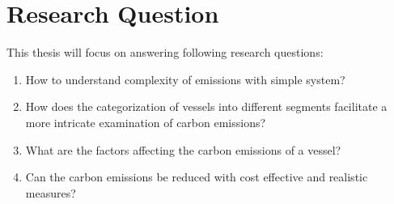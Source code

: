 \section{Research Question}

This thesis will focus on answering following research questions:

\begin{enumerate}
    \item How to understand complexity of emissions with simple system?
    \item How does the categorization of vessels into different segments facilitate a more intricate examination of carbon emissions?
    \item What are the factors affecting the carbon emissions of a vessel?
    \item Can the carbon emissions be reduced with cost effective and realistic measures?
\end{enumerate}